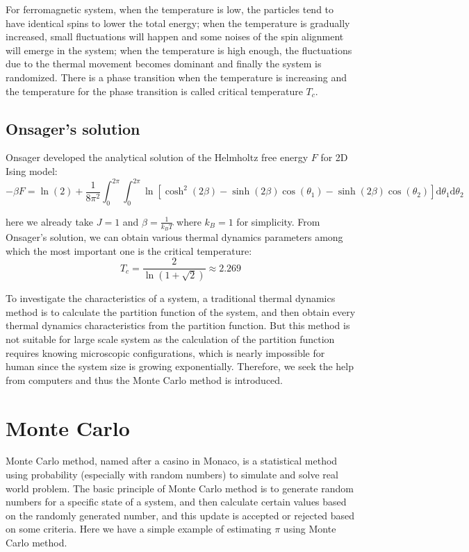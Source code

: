 \documentclass[11pt, a4paper]{article}
\begin{document}
For ferromagnetic system, when the temperature is low, the particles tend to have identical spins to lower the total energy; when the temperature is gradually increased, small fluctuations will happen and some noises of the spin alignment will emerge in the system; when the temperature is high enough, the fluctuations due to the thermal movement becomes dominant and finally the system is randomized. There is a phase transition when the temperature is increasing and the temperature for the phase transition is called critical temperature $T_c$.

\subsection{Onsager's solution}
Onsager developed the analytical solution of the Helmholtz free energy $F$ for 2D Ising model\cite{Onsager}:
\begin{equation}
-\beta F = \ln(2) + \frac{1}{8\pi^2} \int_{0}^{2\pi} \int_{0}^{2\pi} \ln\left[\cosh^2(2\beta) - \sinh(2\beta)\cos(\theta_1) - \sinh(2\beta)\cos(\theta_2)\right] \text{d}\theta_1 \text{d}\theta_2 \label{eq:Onsager F}
\end{equation}

here we already take $J = 1$ and $\beta = \frac{1}{k_BT}$ where $k_B = 1$ for simplicity. From Onsager's solution, we can obtain various thermal dynamics parameters among which the most important one is the critical temperature:
\begin{equation}
T_c = \frac{2}{\ln(1+\sqrt{2})} \approx 2.269 \label{eq:Onsager solution}
\end{equation}

To investigate the characteristics of a system, a traditional thermal dynamics method is to calculate the partition function of the system, and then obtain every thermal dynamics characteristics from the partition function. But this method is not suitable for large scale system as the calculation of the partition function requires knowing microscopic configurations, which is nearly impossible for human since the system size is growing exponentially. Therefore, we seek the help from computers and thus the Monte Carlo method is introduced.

\section{Monte Carlo}
Monte Carlo method, named after a casino in Monaco, is a statistical method using probability (especially with random numbers) to simulate and solve real world problem\cite{MCWiki}. The basic principle of Monte Carlo method is to generate random numbers for a specific state of a system, and then calculate certain values based on the randomly generated number, and this update is accepted or rejected based on some criteria. Here we have a simple example of estimating $\pi$ using Monte Carlo method.
\end{document}
